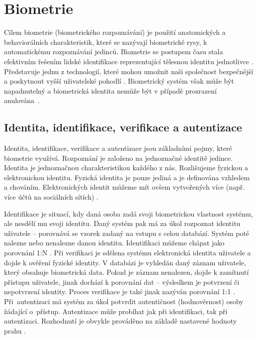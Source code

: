 \section{Biometrie}
Cílem biometrie (biometrického rozpoznávání) je použití anatomických a behaviorálních charakteristik, které se nazývají biometrické rysy, k automatickému rozpoznávání jedinců. Biometrie se postupem času stala efektivním řešením lidské identifikace reprezentující tělesnou identitu jednotlivce \cite{Maltoni2009}. Představuje jednu z technologií, které mohou umožnit naši společnost bezpečnější a poskytnout vyšší uživatelské pohodlí \cite{Maltoni2009}. Biometrický systém však může být napadnutelný a biometrická identita nemůže být v případě prozrazení anulována~\cite{BIOopora}.
\subsection*{Identita, identifikace, verifikace a autentizace}
Identita, identifikace, verifikace a autentizace jsou základními pojmy, které biometrie využívá. Rozpoznání je založeno na jednoznačné identitě jedince. Identita je jednoznačnou charakteristikou každého z nás. Rozlišujeme fyzickou a elektronickou identitu. Fyzická identita je pouze jediná a je definována vzhledem a chováním. Elektronických identit můžeme mít ovšem vytvořených více (např. více účtů na sociálních sítích) \cite{BIOopora}.

Identifikace je situací, kdy daná osoba zadá svoji biometrickou vlastnost systému, ale nesdělí mu svoji identitu. Daný systém pak má za úkol rozpoznat identitu uživatele -- porovnává se vzorek zadaný na vstupu s celou databází. Systém poté nalezne nebo nenalezne danou identitu. Identifikaci můžeme chápat jako porovnání 1:N \cite{BIOopora}. Při verifikaci je sdělena systému elektronická identita uživatele a dojde k ověření fyzické identity. V databázi je vyhledán daný záznam uživatele, který obsahuje biometrická data. Pokud je záznam nenalezen, dojde k zamítnutí přístupu uživatele, jinak dochází k porovnání dat -- výsledkem je potvrzení či nepotvrzení identity. Proces verifikace je také jinak nazýván porovnání 1:1 \cite{BIOopora}. Při~autentizaci má systém za úkol potvrdit autentičnost (hodnověrnost) osoby žádající o~přístup. Autentizace může probíhat jak při identifikaci, tak při autentizaci. Rozhodnutí je obvykle prováděno na základě nastavené hodnoty prahu \cite{BIOopora}.
